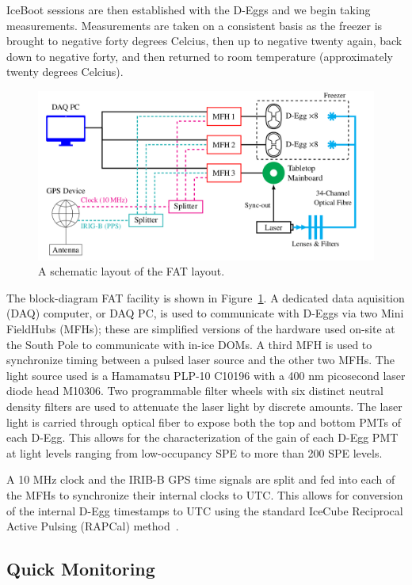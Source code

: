 \documentclass[main.tex]{subfiles}
\begin{document}
IceBoot sessions are then established with the D-Eggs and we begin taking measurements. 
Measurements are taken on a consistent basis as the freezer is brought to negative forty degrees Celcius, then up to negative twenty again, back down to negative forty, and then returned to room temperature (approximately twenty degrees Celcius). 

\begin{figure}
    \centering
    \includegraphics[width=\linewidth]{figures/fat_layout.png}
    \caption{A schematic layout of the FAT layout. }
    \label{fig:fatscheme}
\end{figure}

The block-diagram FAT facility is shown in Figure~\ref{fig:fatscheme}. 
A dedicated data aquisition (DAQ) computer, or DAQ PC, is used to communicate with D-Eggs via two Mini FieldHubs (MFHs); these are simplified versions of the hardware used on-site at the South Pole to communicate with in-ice DOMs. 
A third MFH is used to synchronize timing between a pulsed laser source and the other two MFHs. 
The light source used is a Hamamatsu PLP-10 C10196 with a 400 nm picosecond laser diode head M10306.
Two programmable filter wheels with six distinct neutral density filters are used to attenuate the laser light by discrete amounts. 
The laser light is carried through optical fiber to expose both the top and bottom PMTs of each D-Egg.
This allows for the characterization of the gain of each D-Egg PMT at light levels ranging from low-occupancy SPE to more than 200 SPE levels. 

A 10 MHz clock and the IRIB-B GPS time signals are split and fed into each of the MFHs to synchronize their internal clocks to UTC.
This allows for conversion of the internal D-Egg timestamps to UTC using the standard IceCube Reciprocal Active Pulsing (RAPCal) method~\cite{ABBASI2009294}.


\subsection{Quick Monitoring}
\end{document}
